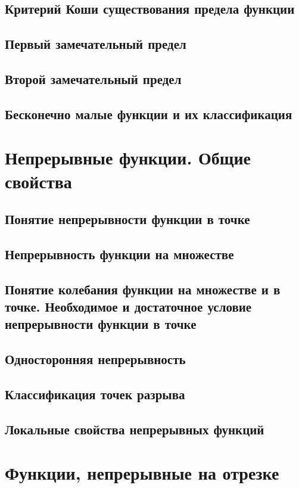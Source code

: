 \subsection{Критерий Коши существования предела функции}
\subsection{Первый замечательный предел}
\subsection{Второй замечательный предел}
\subsection{Бесконечно малые функции и их классификация}

\section{Непрерывные функции. Общие свойства}
\subsection{Понятие непрерывности функции в точке}
\subsection{Непрерывность функции на множестве}
\subsection{Понятие колебания функции на множестве и в точке. Необходимое и достаточное условие непрерывности функции в точке}
\subsection{Односторонняя непрерывность}
\subsection{Классификация точек разрыва}
\subsection{Локальные свойства непрерывных функций}
\section{Функции, непрерывные на отрезке}

